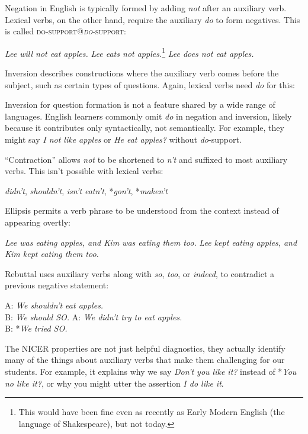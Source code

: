 Negation in English is typically formed by adding \textit{not} after an auxiliary verb. Lexical verbs, on the other hand, require the auxiliary \textit{do} to form negatives. This is called \textsc{do-support@\textit{do}-support}:

\ea
\ea \textit{Lee will not eat apples.}
\ex *\textit{Lee eats not apples.}\footnote{This would have been fine even as recently as Early Modern English (the language of Shakespeare), but not today.}
\ex \textit{Lee does not eat apples.}
\z\z

Inversion describes constructions where the auxiliary verb comes before the subject, such as certain types of questions. Again, lexical verbs need \textit{do} for this:


Inversion for question formation is not a feature shared by a wide range of languages. English learners commonly omit \textit{do} in negation and inversion, likely because it contributes only syntactically, not semantically. For example, they might say \textit{I not like apples} or \textit{He eat apples?} without \textit{do}-support.

``Contraction'' allows \textit{not} to be shortened to \textit{n't} and suffixed to most auxiliary verbs. This isn't possible with lexical verbs:

\ea \textit{didn't}, \textit{shouldn't}, \textit{isn't}
\ex *\textit{eatn't}, *\textit{gon't}, *\textit{maken't}
\z

Ellipsis permits a verb phrase to be understood from the context instead of appearing overtly:

\ea \textit{Lee was eating apples, and Kim was {\op}eating them{\cp} too.}
\ex *\textit{Lee kept eating apples, and Kim kept {\op}eating them{\cp} too.}
\z

Rebuttal uses auxiliary verbs along with \textit{so}, \textit{too}, or \textit{indeed}, to contradict a previous negative statement:

\ea A: \textit{We shouldn't eat apples.}\\
B: \textit{We should SO.}
\ex A: \textit{We didn't try to eat apples.}
\\ B: *\textit{We tried SO.}
\z

The NICER properties are not just helpful diagnostics, they actually identify many of the things about auxiliary verbs that make them challenging for our students. For example, it explains why we say \textit{Don't you like it?} instead of *\textit{You no like it?}, or why you might utter the assertion \textit{I do like it}.

